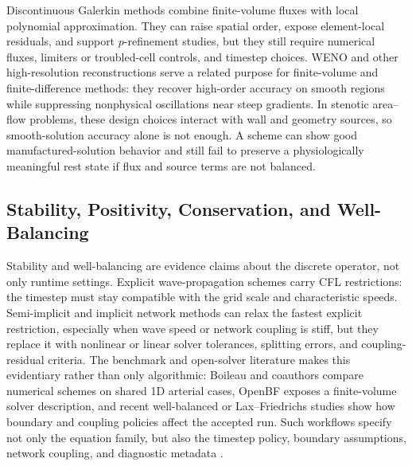 Discontinuous Galerkin methods combine finite-volume fluxes with local
polynomial approximation. They can raise spatial order, expose element-local
residuals, and support $p$-refinement studies, but they still require numerical
fluxes, limiters or troubled-cell controls, and timestep choices. WENO and other
high-resolution reconstructions serve a related purpose for finite-volume and
finite-difference methods: they recover high-order accuracy on smooth regions
while suppressing nonphysical oscillations near steep gradients. In stenotic
area--flow problems, these design choices interact with wall and geometry
sources, so smooth-solution accuracy alone is not enough. A scheme can show good
manufactured-solution behavior and still fail to preserve a physiologically
meaningful rest state if flux and source terms are not balanced.

\subsection{Stability, Positivity, Conservation, and Well-Balancing}
\label{subsec:numerical-methods-stability-positivity-balance}

Stability and well-balancing are evidence claims about the discrete operator,
not only runtime settings. Explicit wave-propagation schemes carry CFL
restrictions: the timestep must stay
compatible with the grid scale and characteristic speeds. Semi-implicit and
implicit network methods can relax the fastest explicit restriction, especially
when wave speed or network coupling is stiff, but they replace it with nonlinear
or linear solver tolerances, splitting errors, and coupling-residual criteria.
The benchmark and open-solver literature makes this evidentiary rather than
only algorithmic: Boileau and coauthors compare numerical schemes on shared 1D
arterial cases, OpenBF exposes a finite-volume solver description, and recent
well-balanced or Lax--Friedrichs studies show how boundary and coupling
policies affect the accepted run. Such workflows specify not only the equation
family, but also the timestep policy, boundary assumptions, network coupling,
and diagnostic metadata
\cite{BoileauEtAl2015Benchmark,BenemeritoEtAl2024OpenBF,BeckersKolbe2025LaxFriedrichsHemodynamics,
LuccaEtAl2025FFRPrediction}.

